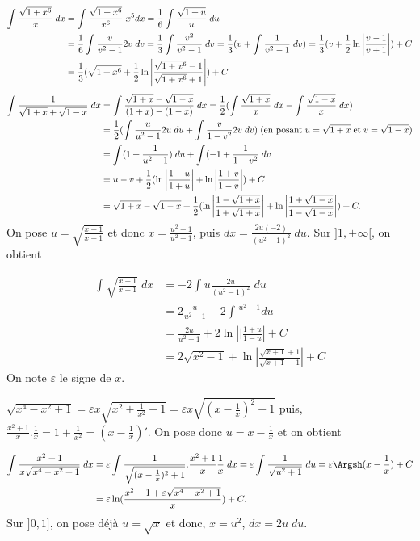 {{\begin{align*}\ensuremath
\int_{}^{}\frac{\sqrt{1+x^6}}{x}\;dx&=\int_{}^{}\frac{\sqrt{1+x^6}}{x^6}\;x^5dx=\frac{1}{6}\int_{}^{}\frac{\sqrt{1+u}}{u}\;du\\
 &=\frac{1}{6}\int_{}^{}\frac{v}{v^2-1}2v\;dv=\frac{1}{3}\int_{}^{}\frac{v^2}{v^2-1}\;dv=\frac{1}{3}(v+\int_{}^{}\frac{1}{v^2-1}\;dv)
=\frac{1}{3}(v+\frac{1}{2}\ln\left|\frac{v-1}{v+1}\right|)+C\\
 &=\frac{1}{3}(\sqrt{1+x^6}+\frac{1}{2}\ln\left|\frac{\sqrt{1+x^6}-1}{\sqrt{1+x^6}+1}\right|)+C\\
\end{align*}
\begin{align*}\ensuremath
\int_{}^{}\frac{1}{\sqrt{1+x}+\sqrt{1-x}}\;dx&=\int_{}^{}\frac{\sqrt{1+x}-\sqrt{1-x}}{(1+x)-(1-x)}\;dx
=\frac{1}{2}(\int_{}^{}\frac{\sqrt{1+x}}{x}\;dx-\int_{}^{}\frac{\sqrt{1-x}}{x}\;dx)\\
 &=\frac{1}{2}(\int_{}^{}\frac{u}{u^2-1}2u\;du+\int_{}^{}\frac{v}{1-v^2}2v\;dv)\;(\mbox{en posant}\;u=\sqrt{1+x}\;\mbox{et}\;v=\sqrt{1-x})\\
 &=\int_{}^{}(1+\frac{1}{u^2-1})\;du+\int_{}^{}(-1+\frac{1}{1-v^2}\;dv\\
 &=u-v+\frac{1}{2}(\ln\left|\frac{1-u}{1+u}\right|+\ln\left|\frac{1+v}{1-v}\right|)+C\\
 &=\sqrt{1+x}-\sqrt{1-x}+\frac{1}{2}(\ln\left|\frac{1-\sqrt{1+x}}{1+\sqrt{1+x}}\right|+\ln\left|\frac{1+\sqrt{1-x}}{1-\sqrt{1-x}}\right|)+C.
\end{align*}
On pose $u=\sqrt{\frac{x+1}{x-1}}$ et donc $x=\frac{u^2+1}{u^2-1}$, puis $dx=\frac{2u(-2)}{(u^2-1)^2}\;du$. Sur $]1,+\infty[$, on obtient

\begin{align*}
\int_{}^{}\sqrt{\frac{x+1}{x-1}}\;dx&=-2\int_{}^{}u\frac{2u}{(u^2-1)^2}\;du\\
 &=2\frac{u}{u^2-1}-2\int_{}^{}\frac{u^2-1}\;du\\
 &=\frac{2u}{u^2-1}+2\ln\left||\frac{1+u}{1-u}\right|+C\\
 &=2\sqrt{x^2-1}+\ln\left|\frac{\sqrt{x+1}+1}{\sqrt{x+1}-1}\right|+C
\end{align*}
On note $\varepsilon$ le signe de $x$.

$\sqrt{x^4-x^2+1}=\varepsilon x\sqrt{x^2+\frac{1}{x^2}-1}=\varepsilon x\sqrt{(x-\frac{1}{x})^2+1}$ puis, $\frac{x^2+1}{x}.\frac{1}{x}=1+\frac{1}{x^2}=(x-\frac{1}{x})'$. On pose donc $u=x-\frac{1}{x}$ et on obtient

\begin{align*}\ensuremath
\int_{}^{}\frac{x^2+1}{x\sqrt{x^4-x^2+1}}\;dx&=\varepsilon\int_{}^{}\frac{1}{\sqrt{(x-\frac{1}{x})^2+1}}.\frac{x^2+1}{x}\frac{1}{x}\;dx
=\varepsilon\int_{}^{}\frac{1}{\sqrt{u^2+1}}\;du=\varepsilon\Argsh(x-\frac{1}{x})+C\\
 &=\varepsilon\ln(\frac{x^2-1+\varepsilon\sqrt{x^4-x^2+1}}{x})+C.
\end{align*}
Sur $]0,1]$, on pose déjà $u=\sqrt{x}$ et donc, $x=u^2$, $dx=2u\;du$.

}}
